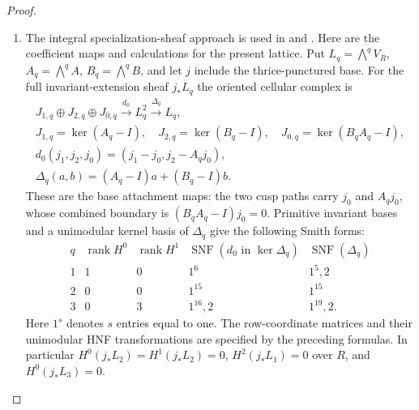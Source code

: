 \documentclass[11pt,a4paper]{article}
\numberwithin{equation}{section}
\theoremstyle{definition}
\begin{document}
\begin{proof}
\begin{enumerate}[label=\arabic*.]
Put $T=D^t$.  Its polynomial is $(x-1)\Phi_{12}(x)$, and
\[
 E=\Phi_{12}(T)=T^4-T^2+I,\qquad E^2=E,\qquad
 \sum_{j=0}^{11}T^j=12E.
\]
The image of this integral rank-one idempotent is the primitive
invariant line.  Hence the norm for every stated $m_2$ is $m_2E$.
The Wang sequence in degree two has quotient
$\operatorname{Inv}(\bigwedge^2T)$ and kernel
$\operatorname{coker}(T-I)$.  Restriction to the $m_2$-fold cover
projects identically onto the former group.  On the latter it is
the horizontal wedge with the norm: a horizontal cell lifts to
$m_2$ successive transported prisms.
Consequently the restriction image $J_2$ projects onto the vertical
invariants, and its intersection with the horizontal invariant
summand is $e_0\wedge m_2\operatorname{Inv}(T)$.
The horizontal inclusion induces the isomorphism
\[
 \frac{\operatorname{Inv}(T)}{m_2\operatorname{Inv}(T)}
 \ \xrightarrow{\ \sim\ }\\
 \frac{\operatorname{Inv}(\bigwedge^2V_R)}{J_2}
 \ \cong\ R/3^rR.
\]
At the first finite cap, $m_1$ is a unit
in $R$, so transfer and averaging give the full invariant image
and zero kernel.  At the cusp, \cref{night:P1.11} gives injective
restrictions onto the invariant lattices in degrees one, two
and three, by dualizing its saturated-kernel collapse.

\item The integral specialization-sheaf approach is used in
\cite[Lemma 7.25 and Propositions 7.26--7.27, pp.~61--63]{AC26}
and \cite[\S7, pp.~17--21]{E26}.
Here are the coefficient maps and calculations for the present lattice.  Put $L_q=\bigwedge^qV_R$, $A_q=\bigwedge^qA$,
$B_q=\bigwedge^qB$, and let $j$ include the thrice-punctured base.
For the full invariant-extension sheaf $j_*L_q$ the oriented
cellular complex is
\[
\begin{gathered}
 J_{1,q}\oplus J_{2,q}\oplus J_{0,q}
 \xrightarrow{d_0}L_q^2\xrightarrow{\Delta_q}L_q,\\
 J_{1,q}=\ker(A_q-I),\quad J_{2,q}=\ker(B_q-I),\quad
 J_{0,q}=\ker(B_qA_q-I),\\
 d_0(j_1,j_2,j_0)=(j_1-j_0,j_2-A_qj_0),\\
 \Delta_q(a,b)=(A_q-I)a+(B_q-I)b.
\end{gathered}
\]
These are the base attachment maps: the two cusp paths
carry $j_0$ and $A_qj_0$, whose combined boundary is
$(B_qA_q-I)j_0=0$.  Primitive invariant bases and a unimodular
kernel basis of $\Delta_q$ give the following Smith forms:
\[
\begin{array}{c|c|c|c|c}
q&\operatorname{rank}H^0&\operatorname{rank}H^1&
 \operatorname{SNF}(d_0\text{ in }\ker\Delta_q)&
 \operatorname{SNF}(\Delta_q)\\\hline
1&1&0&1^6&1^5,2\\
2&0&0&1^{15}&1^{15}\\
3&0&3&1^{16},2&1^{19},2.
\end{array}
\]
Here $1^s$ denotes $s$ entries equal to one.  The row-coordinate
matrices and their unimodular HNF transformations are specified by the preceding formulas.
In particular $H^0(j_*L_2)=H^1(j_*L_2)=0$,
$H^2(j_*L_1)=0$ over $R$, and $H^0(j_*L_3)=0$.


\end{enumerate}
\end{proof}
\end{document}
